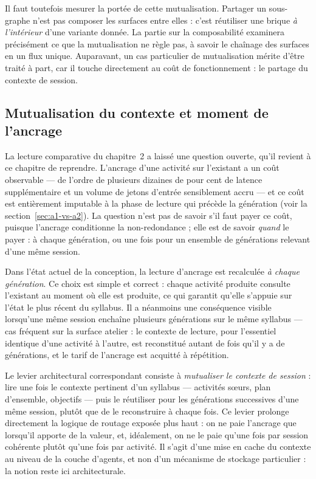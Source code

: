 Il faut toutefois mesurer la portée de cette mutualisation. Partager
un sous-graphe n'est pas composer les surfaces entre elles : c'est
réutiliser une brique \emph{à l'intérieur} d'une variante donnée. La
partie sur la composabilité examinera précisément ce que la
mutualisation ne règle pas, à savoir le chaînage des surfaces en un
flux unique. Auparavant, un cas particulier de mutualisation mérite
d'être traité à part, car il touche directement au coût de
fonctionnement : le partage du contexte de session.

\subsection{Mutualisation du contexte et moment de l'ancrage}
\label{sec:cache-contexte}

La lecture comparative du chapitre~2 a laissé une question ouverte,
qu'il revient à ce chapitre de reprendre. L'ancrage d'une activité sur
l'existant a un coût observable — de l'ordre de plusieurs dizaines de
pour cent de latence supplémentaire et un volume de jetons d'entrée
sensiblement accru — et ce coût est entièrement imputable à la phase
de lecture qui précède la génération (voir la
section~\ref{sec:a1-vs-a2}). La question n'est pas de savoir s'il faut
payer ce coût, puisque l'ancrage conditionne la non-redondance ; elle
est de savoir \emph{quand} le payer : à chaque génération, ou une fois
pour un ensemble de générations relevant d'une même session.

Dans l'état actuel de la conception, la lecture d'ancrage est
recalculée \emph{à chaque génération}. Ce choix est simple et correct :
chaque activité produite consulte l'existant au moment où elle est
produite, ce qui garantit qu'elle s'appuie sur l'état le plus récent du
syllabus. Il a néanmoins une conséquence visible lorsqu'une même
session enchaîne plusieurs générations sur le même syllabus — cas
fréquent sur la surface atelier : le contexte de lecture, pour
l'essentiel identique d'une activité à l'autre, est reconstitué autant
de fois qu'il y a de générations, et le tarif de l'ancrage est acquitté
à répétition.

Le levier architectural correspondant consiste à \emph{mutualiser le
contexte de session} : lire une fois le contexte pertinent d'un
syllabus — activités sœurs, plan d'ensemble, objectifs — puis le
réutiliser pour les générations successives d'une même session, plutôt
que de le reconstruire à chaque fois. Ce levier prolonge directement la
logique de routage exposée plus haut : on ne paie l'ancrage que
lorsqu'il apporte de la valeur, et, idéalement, on ne le paie qu'une
fois par session cohérente plutôt qu'une fois par activité. Il s'agit
d'une mise en cache du contexte au niveau de la couche d'agents, et non
d'un mécanisme de stockage particulier : la notion reste ici
architecturale.


